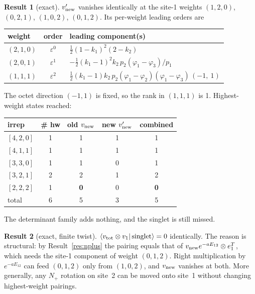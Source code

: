 \documentclass[11pt]{article}
\theoremstyle{definition}
\newtheorem{result}{Result}
\theoremstyle{remark}
\begin{document}
\begin{result}[exact]\label{res:det}
$v'_{\rm new}$ vanishes identically at the site-1 weights $(1,2,0)$, $(0,2,1)$, $(1,0,2)$, $(0,1,2)$. Its per-weight leading orders are
\begin{center}
\begin{tabular}{lcl}\toprule
weight & order & leading component(s)\\\midrule
$(2,1,0)$ & $\varepsilon^0$ & $\tfrac12(1-k_1)^2(2-k_2)$\\
$(2,0,1)$ & $\varepsilon^1$ & $-\tfrac12(k_1-1)^2k_2\,p_2(\varphi_1-\varphi_3)/p_1$\\
$(1,1,1)$ & $\varepsilon^2$ & $\tfrac12(k_1-1)k_2\,p_2(\varphi_1-\varphi_2)(\varphi_1-\varphi_3)\,(-1,\ 1)$\\\bottomrule
\end{tabular}
\end{center}
The octet direction $(-1,1)$ is fixed, so the rank in $(1,1,1)$ is 1. Highest-weight states reached:
\begin{center}
\begin{tabular}{lcccc}\toprule
irrep & \# hw & old $v_{\rm new}$ & new $v'_{\rm new}$ & combined\\\midrule
$[4,2,0]$ & 1 & 1 & 1 & 1\\
$[4,1,1]$ & 1 & 1 & 1 & 1\\
$[3,3,0]$ & 1 & 1 & 0 & 1\\
$[3,2,1]$ & 2 & 2 & 1 & 2\\
$[2,2,2]$ & 1 & \textbf{0} & 0 & \textbf{0}\\\midrule
total & 6 & 5 & 3 & 5\\\bottomrule
\end{tabular}
\end{center}
The determinant family adds nothing, and the singlet is still missed.
\end{result}

\begin{result}[exact, finite twist]\label{res:singlet}
$\langle v_{\rm tot}\otimes v_1|\,\text{singlet}\rangle=0$ identically. The reason is structural: by Result~\ref{res:nplus} the pairing equals that of $v_{\rm new}e^{-aE_{12}}\otimes e_1^T$, which needs the site-1 component of weight $(0,1,2)$. Right multiplication by $e^{-aE_{12}}$ can feed $(0,1,2)$ only from $(1,0,2)$, and $v_{\rm new}$ vanishes at both. More generally, any $N_+$ rotation on site~2 can be moved onto site~1 without changing highest-weight pairings.
\end{result}
\end{document}
